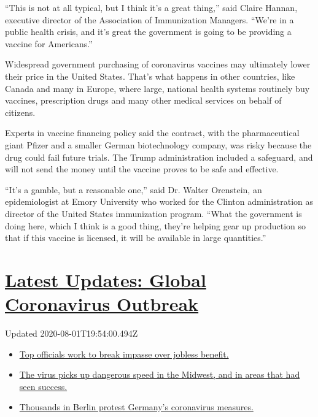 ``This is not at all typical, but I think it's a great thing,'' said
Claire Hannan, executive director of the Association of Immunization
Managers. ``We're in a public health crisis, and it's great the
government is going to be providing a vaccine for Americans.''

Widespread government purchasing of coronavirus vaccines may ultimately
lower their price in the United States. That's what happens in other
countries, like Canada and many in Europe, where large, national health
systems routinely buy vaccines, prescription drugs and many other
medical services on behalf of citizens.

Experts in vaccine financing policy said the contract, with the
pharmaceutical giant Pfizer and a smaller German biotechnology company,
was risky because the drug could fail future trials. The Trump
administration included a safeguard, and will not send the money until
the vaccine proves to be safe and effective.

``It's a gamble, but a reasonable one,'' said Dr. Walter Orenstein, an
epidemiologist at Emory University who worked for the Clinton
administration as director of the United States immunization program.
``What the government is doing here, which I think is a good thing,
they're helping gear up production so that if this vaccine is licensed,
it will be available in large quantities.''

\hypertarget{latest-updates-global-coronavirus-outbreak}{%
\section{\texorpdfstring{\href{https://www.nytimes3xbfgragh.onion/2020/08/01/world/coronavirus-covid-19.html?action=click\&pgtype=Article\&state=default\&region=MAIN_CONTENT_1\&context=storylines_live_updates}{Latest
Updates: Global Coronavirus
Outbreak}}{Latest Updates: Global Coronavirus Outbreak}}\label{latest-updates-global-coronavirus-outbreak}}

Updated 2020-08-01T19:54:00.494Z

\begin{itemize}
\tightlist
\item
  \href{https://www.nytimes3xbfgragh.onion/2020/08/01/world/coronavirus-covid-19.html?action=click\&pgtype=Article\&state=default\&region=MAIN_CONTENT_1\&context=storylines_live_updates\#link-3ac56579}{Top
  officials work to break impasse over jobless benefit.}
\item
  \href{https://www.nytimes3xbfgragh.onion/2020/08/01/world/coronavirus-covid-19.html?action=click\&pgtype=Article\&state=default\&region=MAIN_CONTENT_1\&context=storylines_live_updates\#link-8796723}{The
  virus picks up dangerous speed in the Midwest, and in areas that had
  seen success.}
\item
  \href{https://www.nytimes3xbfgragh.onion/2020/08/01/world/coronavirus-covid-19.html?action=click\&pgtype=Article\&state=default\&region=MAIN_CONTENT_1\&context=storylines_live_updates\#link-25930521}{Thousands
  in Berlin protest Germany's coronavirus measures.}
\end{itemize}

